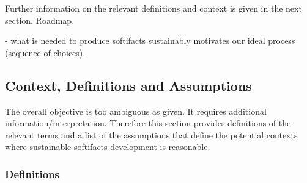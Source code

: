 \documentclass[12pt]{article}
\begin{document}
Further information on the relevant definitions and context is given in the next
section.  Roadmap.

- what is needed to produce softifacts sustainably motivates our ideal process
(sequence of choices).

\subsection*{Context, Definitions and Assumptions} \label{Sec_Context}

The overall objective is too ambiguous as given.  It requires additional
information/interpretation.  Therefore this section provides definitions of the
relevant terms and a list of the assumptions that define the potential contexts
where sustainable softifacts development is reasonable.

\subsubsection*{Definitions}
\end{document}
